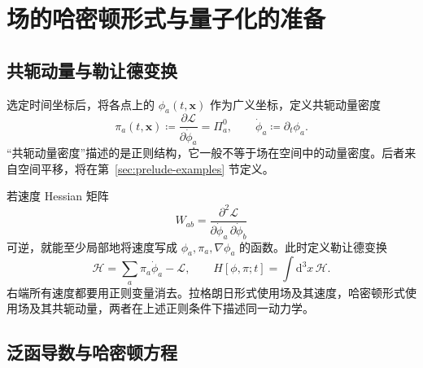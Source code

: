 \section{场的哈密顿形式与量子化的准备}
\label{sec:prelude-hamiltonian}

\subsection{共轭动量与勒让德变换}

选定时间坐标后，将各点上的 $\phi_{a}(t,\bm{x})$ 作为广义坐标，定义共轭动量密度
\begin{equation}
  \pi_{a}(t,\bm{x})\coloneqq
  \frac{\partial\mathcal{L}}{\partial\dot\phi_{a}}=\Pi_{a}^{0},
  \qquad \dot\phi_{a}\coloneqq\partial_{t}\phi_{a}.
\end{equation}
“共轭动量密度”描述的是正则结构，它一般不等于场在空间中的动量密度。后者来自空间平移，将在第~\ref{sec:prelude-examples} 节定义。

若速度 Hessian 矩阵
\begin{equation}
  W_{ab}=\frac{\partial^{2}\mathcal{L}}
  {\partial\dot\phi_{a}\,\partial\dot\phi_{b}}
\end{equation}
可逆，就能至少局部地将速度写成 $\phi_{a},\pi_{a},\nabla\phi_{a}$ 的函数。此时定义勒让德变换
\begin{equation}
  \mathcal{H}=\sum_{a}\pi_{a}\dot\phi_{a}-\mathcal{L},
  \qquad H[\phi,\pi;t]=\int\mathrm{d}^{3}x\,\mathcal{H}.
  \label{eq:prelude-hamiltonian-definition}
\end{equation}
右端所有速度都要用正则变量消去。拉格朗日形式使用场及其速度，哈密顿形式使用场及其共轭动量，两者在上述正则条件下描述同一动力学。

\subsection{泛函导数与哈密顿方程}

